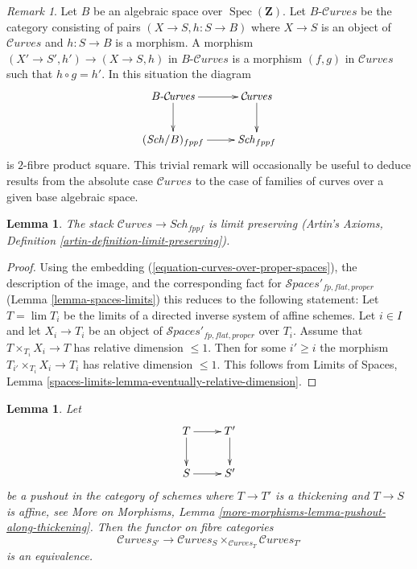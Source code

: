 \documentclass{stacks-project}
\theoremstyle{plain}
\newtheorem{lemma}[subsection]{Lemma}
\theoremstyle{definition}
\theoremstyle{remark}
\newtheorem{remark}[subsection]{Remark}
\numberwithin{equation}{subsection}
\def\lim{\mathop{\mathrm{lim}}\nolimits}
\def\Spec{\mathop{\mathrm{Spec}}}
\def\Sch{\mathit{Sch}}
\def\Spacesstack{\mathcal{S}\!\mathit{paces}}
\def\Curvesstack{\mathcal{C}\!\mathit{urves}}
\begin{document}
\begin{remark}
\label{remark-curves-base-change}
Let $B$ be an algebraic space over $\Spec(\mathbf{Z})$.
Let $B\text{-}\Curvesstack$ be the category consisting
of pairs $(X \to S, h : S \to B)$
where $X \to S$ is an object of
$\Curvesstack$ and $h : S \to B$ is a morphism.
A morphism $(X' \to S', h') \to (X \to S, h)$
in $B\text{-}\Curvesstack$ is a morphism $(f, g)$
in $\Curvesstack$ such that $h \circ g = h'$.
In this situation the diagram
$$
\xymatrix{
B\text{-}\Curvesstack \ar[r] \ar[d] & \Curvesstack \ar[d] \\
(\Sch/B)_{fppf} \ar[r] & \Sch_{fppf}
}
$$
is $2$-fibre product square. This trivial remark
will occasionally be useful to deduce results from
the absolute case $\Curvesstack$ to the case
of families of curves over a given base algebraic space.
\end{remark}

\begin{lemma}
\label{lemma-curves-limits}
The stack $\Curvesstack \to \Sch_{fppf}$ is limit preserving
(Artin's Axioms, Definition \ref{artin-definition-limit-preserving}).
\end{lemma}

\begin{proof}
Using the embedding (\ref{equation-curves-over-proper-spaces}),
the description of the image, and
the corresponding fact for $\Spacesstack'_{fp, flat, proper}$
(Lemma \ref{lemma-spaces-limits})
this reduces to the following statement:
Let $T = \lim T_i$ be the limits of a
directed inverse system of affine schemes.
Let $i \in I$ and let $X_i \to T_i$ be an object of
$\Spacesstack'_{fp, flat, proper}$ over $T_i$.
Assume that $T \times_{T_i} X_i \to T$ has
relative dimension $\leq 1$.
Then for some $i' \geq i$ the morphism
$T_{i'} \times_{T_i} X_i \to T_i$ has
relative dimension $\leq 1$. This follows from
Limits of Spaces, Lemma
\ref{spaces-limits-lemma-eventually-relative-dimension}.
\end{proof}

\begin{lemma}
\label{lemma-curves-RS-star}
Let
$$
\xymatrix{
T \ar[r] \ar[d] & T' \ar[d] \\
S \ar[r] & S'
}
$$
be a pushout in the category of schemes where
$T \to T'$ is a thickening and $T \to S$ is affine, see
More on Morphisms, Lemma \ref{more-morphisms-lemma-pushout-along-thickening}.
Then the functor on fibre categories
$$
\Curvesstack_{S'}
\longrightarrow
\Curvesstack_S
\times_{\Curvesstack_T}
\Curvesstack_{T'}
$$
is an equivalence.
\end{lemma}
\end{document}
